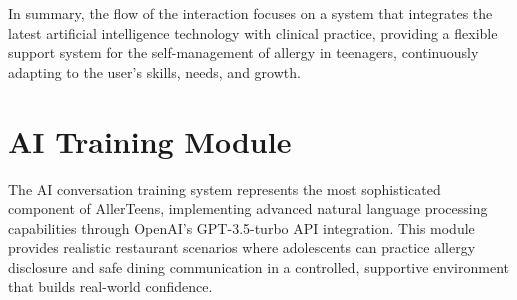 \documentclass[MScCS]{uccthesis}
\begin{document}
In summary, the flow of the interaction focuses on a system that integrates the latest artificial intelligence technology with clinical practice, providing a flexible support system for the self-management of allergy in teenagers, continuously adapting to the user's skills, needs, and growth.

\section{AI Training Module}

The AI conversation training system represents the most sophisticated component of AllerTeens, implementing advanced natural language processing capabilities through OpenAI's GPT-3.5-turbo API integration. This module provides realistic restaurant scenarios where adolescents can practice allergy disclosure and safe dining communication in a controlled, supportive environment that builds real-world confidence.
\end{document}
